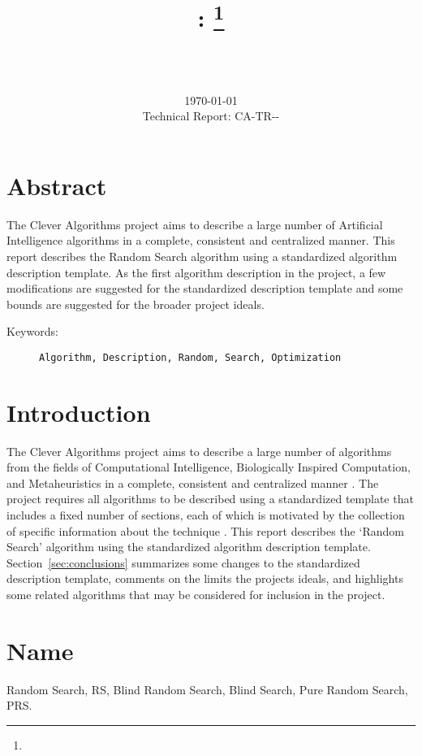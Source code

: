 \documentclass[a4paper, 11pt]{article}
\title{{\myreporttitle}: {\myreportsubtitle}\footnote{\myreportlicense}}
\author{\myreportauthor\\{\myreportemail}\\\small\myreportproject}
\date{\today\\{\small{Technical Report: CA-TR-{\myreportdate}-\myreportversion}}}
\begin{document}
\maketitle

\section*{Abstract} 
The Clever Algorithms project aims to describe a large number of Artificial Intelligence algorithms in a complete, consistent and centralized manner.
This report describes the Random Search algorithm using a standardized algorithm description template.
As the first algorithm description in the project, a few modifications are suggested for the standardized description template and some bounds are suggested for the broader project ideals.

\begin{description}
	\item[Keywords:] {\small\texttt{Algorithm, Description, Random, Search, Optimization}}
\end{description} 

\section{Introduction} 
\label{sec:intro}
The Clever Algorithms project aims to describe a large number of algorithms from the fields of Computational Intelligence, Biologically Inspired Computation, and Metaheuristics in a complete, consistent and centralized manner \cite{Brownlee2010}.
The project requires all algorithms to be described using a standardized template that includes a fixed number of sections, each of which is motivated by the collection of specific information about the technique \cite{Brownlee2010a}.
This report describes the `Random Search' algorithm using the standardized algorithm description template. 
Section~\ref{sec:conclusions} summarizes some changes to the standardized description template, comments on the limits the projects ideals, and highlights some related algorithms that may be considered for inclusion in the project.

\section{Name} 
\label{sec:name}
Random Search, RS, Blind Random Search, Blind Search, Pure Random Search, PRS.
\end{document}
